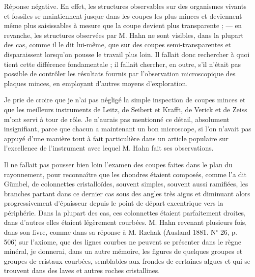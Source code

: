 \documentclass[a4paper, 12pt, oneside, french]{book}
\begin{document}
Réponse négative. En effet, les structures observables sur des organismes vivants et fossiles se maintiennent jusque dans les coupes les plus minces et deviennent même plus saisissables à mesure que la coupe devient plus transparente ; --- en revanche, les structures observées par M. Hahn ne sont visibles, dans la plupart des cas, comme il le dit lui-même, que sur des coupes semi-transparentes et disparaissent lorsqu'on pousse le travail plus loin. Il fallait donc rechercher à quoi tient cette différence fondamentale ; il fallait chercher, en outre, s'il n'était pas possible de contrôler les résultats fournis par l'observation microscopique des plaques minces, en employant d'autres moyens d'exploration.

Je prie de croire que je n'ai pas négligé la simple inspection de coupes minces et que les meilleurs instruments de Leitz, de Seibert et Krafft, de Verick et de Zeiss m'ont servi à tour de rôle. Je n'aurais pas mentionné ce détail, absolument insignifiant, parce que chacun a maintenant un bon microscope, si l'on n'avait pas appuyé d'une manière tout à fait particulière dans un article populaire sur l'excellence de l'instrument avec lequel M. Hahn fait ses observations.

Il ne fallait pas pousser bien loin l'examen des coupes faites dans le plan du rayonnement, pour reconnaître que les chondres étaient composés, comme l'a dit Gümbel, de colonnettes cristalloïdes, souvent simples, souvent aussi ramifiées, les branches partant dans ce dernier cas sous des angles très aigus et diminuant alors progressivement d'épaisseur depuis le point de départ excentrique vers la périphérie. Dans la plupart des cas, ces colonnettes étaient parfaitement droites, dans d'autres elles étaient légèrement courbées. M. Hahn revenant plusieurs fois, dans son livre, comme dans sa réponse à M. Rzehak (Ausland 1881. N$^{\circ}$ 26, p. 506) sur l'axiome, que des lignes courbes ne peuvent se présenter dans le règne minéral, je donnerai, dans un autre mémoire, les figures de quelques groupes et groupes de cristaux courbées, semblables aux frondes de certaines algues et qui se trouvent dans des laves et autres roches cristallines.
\end{document}
